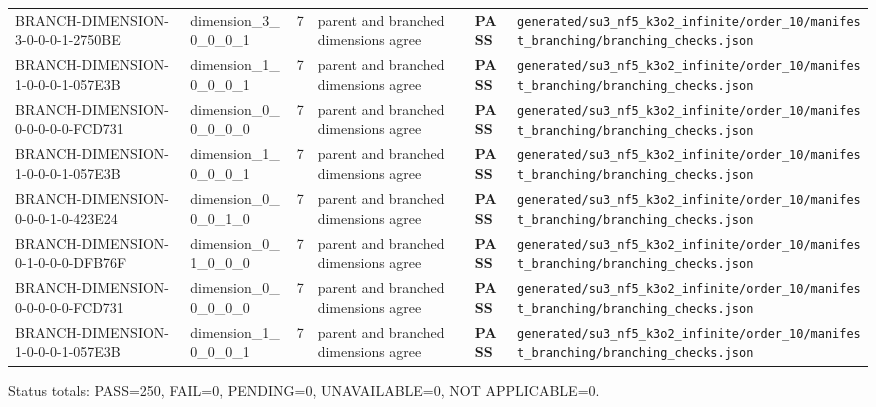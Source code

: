 \documentclass[11pt]{article}
\newcommand{\Pass}{\textcolor{green!50!black}{\textbf{PASS}}}
\newcommand{\RawPath}[1]{\texttt{#1}}
\begin{document}
\begin{longtable}{p{3cm}p{2.5cm}r p{3cm}l p{2cm}}
BRANCH-DIMENSION-3-0-0-0-1-2750BE & dimension\_3\_0\_0\_0\_1 & 7 & parent and branched dimensions agree & \Pass & \RawPath{generated/su3\_nf5\_k3o2\_infinite/order\_10/manifest\_branching/branching\_checks.json}\\
BRANCH-DIMENSION-1-0-0-0-1-057E3B & dimension\_1\_0\_0\_0\_1 & 7 & parent and branched dimensions agree & \Pass & \RawPath{generated/su3\_nf5\_k3o2\_infinite/order\_10/manifest\_branching/branching\_checks.json}\\
BRANCH-DIMENSION-0-0-0-0-0-FCD731 & dimension\_0\_0\_0\_0\_0 & 7 & parent and branched dimensions agree & \Pass & \RawPath{generated/su3\_nf5\_k3o2\_infinite/order\_10/manifest\_branching/branching\_checks.json}\\
BRANCH-DIMENSION-1-0-0-0-1-057E3B & dimension\_1\_0\_0\_0\_1 & 7 & parent and branched dimensions agree & \Pass & \RawPath{generated/su3\_nf5\_k3o2\_infinite/order\_10/manifest\_branching/branching\_checks.json}\\
BRANCH-DIMENSION-0-0-0-1-0-423E24 & dimension\_0\_0\_0\_1\_0 & 7 & parent and branched dimensions agree & \Pass & \RawPath{generated/su3\_nf5\_k3o2\_infinite/order\_10/manifest\_branching/branching\_checks.json}\\
BRANCH-DIMENSION-0-1-0-0-0-DFB76F & dimension\_0\_1\_0\_0\_0 & 7 & parent and branched dimensions agree & \Pass & \RawPath{generated/su3\_nf5\_k3o2\_infinite/order\_10/manifest\_branching/branching\_checks.json}\\
BRANCH-DIMENSION-0-0-0-0-0-FCD731 & dimension\_0\_0\_0\_0\_0 & 7 & parent and branched dimensions agree & \Pass & \RawPath{generated/su3\_nf5\_k3o2\_infinite/order\_10/manifest\_branching/branching\_checks.json}\\
BRANCH-DIMENSION-1-0-0-0-1-057E3B & dimension\_1\_0\_0\_0\_1 & 7 & parent and branched dimensions agree & \Pass & \RawPath{generated/su3\_nf5\_k3o2\_infinite/order\_10/manifest\_branching/branching\_checks.json}\\
\bottomrule\end{longtable}
Status totals: PASS=250, FAIL=0, PENDING=0, UNAVAILABLE=0, NOT APPLICABLE=0.
\end{document}
